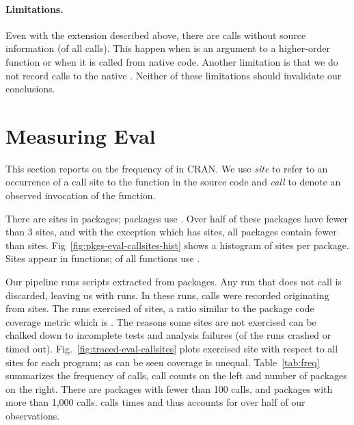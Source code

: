 \documentclass[screen,acmsmall]{acmart}%
\begin{document}
\paragraph{Limitations.} Even with the extension described above, there are
\PkgUndefinedRnd \eval calls without source information (\PkgUndefinedRatio of
all \eval calls). This happen when \eval is an argument to a higher-order
function or when it is called from native code. Another limitation is that we
do not record calls to the native \eval. Neither of these limitations should
invalidate our conclusions.

\section{Measuring Eval}

This section reports on the frequency of \eval in CRAN. We use \emph{site} to
refer to an occurrence of a call site to the \eval function in the source code
and \emph{call} to denote an observed invocation of the \eval function.

There are \PkgEvalCallSites \eval sites in \PkgPackages packages;
\PkgPackagesRatio packages use \eval. Over half of these packages have fewer
than 3 sites, and with the exception \MaxEvalCallSitesPackage which has
\MaxEvalCallSitesCount sites, all packages contain fewer than
\MaxEvalCallSitesRest sites. Fig~\ref{fig:pkgs-eval-callsites-hist} shows a
histogram of sites per package. Sites appear in \PkgFunsWithEval functions;
\CranFunsWithEvalRatio of all functions use \eval.

Our pipeline runs \CranRunnableScripts scripts extracted from \CranPackages
packages. Any run that does not call \eval is discarded, leaving us with
\packageNbruns runs. In these runs, \packageAllcalls \eval calls were recorded
originating from \PkgHitEvalCallSites sites. The runs exercised
\PkgHitEvalCallSitesAvgRatio of sites, a ratio similar to the package code
coverage metric which is \PkgCodeCoverage. The reasons some sites are not
exercised can be chalked down to incomplete tests and analysis failures
(\PkgFailedProgramsRatio of the runs crashed or timed out).
Fig.~\ref{fig:traced-eval-callsites} plots exercised site with respect to all
sites for each program; as can be seen coverage is unequal.
Table~\ref{tab:freq} summarizes the frequency of calls, call counts on the left and
number of packages on the right. There are \packageFewcalls packages with fewer
than 100 calls, and \packageManycalls packages with more than 1,000 calls.
\packageMaxcallspack calls \eval \packageMaxcalls times and thus accounts for
over half of our observations.
\end{document}
